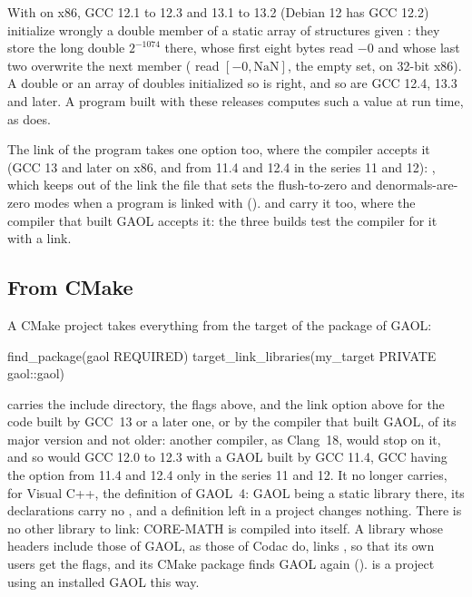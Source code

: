 \documentclass[12pt,a4paper,twoside,openright]{book}
\begin{document}
\begin{Rem}\label{rem:gcc12-denorm}
With  on x86, GCC 12.1 to 12.3 and 13.1 to 13.2
(Debian 12 has GCC 12.2) initialize wrongly a double member of a static array
of structures given : they
store the long double $2^{-1074}$ there, whose first eight bytes read $-0$ and
whose last two overwrite the next member ( read $[-0, \mathrm{NaN}]$, the empty set, on 32-bit x86). A double or an
array of doubles initialized so is right, and so are GCC 12.4, 13.3 and
later. A program built with these releases computes such a value at run time,
as  does.\newinvfive
\end{Rem}

The link of the program takes one option too, where the compiler accepts it
(GCC 13 and later on x86, and from 11.4 and 12.4 in the series 11 and 12):
, which keeps out of the link the file that sets the
flush-to-zero and denormals-are-zero modes when a program is linked with
 ().  and  carry
it too, where the compiler that built GAOL accepts it: the three builds test
the compiler for it with a link.\newinvfive

\subsection{From CMake}\label{sec:compiling-cmake}
%

A CMake project takes everything from the target  of the
package of GAOL:

\begin{example}
find_package(gaol REQUIRED)
target_link_libraries(my_target PRIVATE gaol::gaol)
\end{example}

\noindent
{} carries the include directory, the flags above, and the
link option above for the code built by GCC~13 or a later one, or by the
compiler that built GAOL, of its major version and not older: another
compiler, as Clang~18, would stop on it, and so would GCC 12.0 to 12.3 with a
GAOL built by GCC 11.4, GCC having the option from 11.4 and 12.4 only in the
series 11 and 12. It no longer carries, for Visual C++, the definition
 of GAOL~4: GAOL being a static library there, its
declarations carry no , and a definition left in
a project changes nothing.\newinvfive{} There is no other library to link:
CORE-MATH is compiled into  itself. A library whose headers
include those of GAOL, as those of Codac do, links 
, so that its own users get the flags, and its CMake package
finds GAOL again (). 
is a project using an installed GAOL this way.
\end{document}

